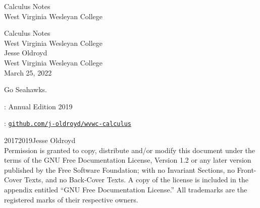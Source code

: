 \documentclass[twoside,10pt,]{book}
\newcommand{\titlepagefont}{\relax}
\newcommand{\mono}[1]{\texttt{#1}}
\numberwithin{equation}{part}
\begin{document}
\raggedbottom
\frontmatter
\thispagestyle{empty}
{\titlepagefont\centering
\vspace*{0.28\textheight}
{\Huge Calculus Notes}\\[2\baselineskip]
{\LARGE West Virginia Wesleyan College}\\
}
\clearpage
\thispagestyle{empty}
\null%
\clearpage
\thispagestyle{empty}
{\titlepagefont\centering
\vspace*{0.14\textheight}
{\Huge Calculus Notes}\\[\baselineskip]
{\LARGE West Virginia Wesleyan College}\\[3\baselineskip]
{\Large Jesse Oldroyd}\\[0.5\baselineskip]
{\Large West Virginia Wesleyan College}\\[3\baselineskip]
{\Large March 25, 2022}\\}
\clearpage
\thispagestyle{empty}
\hypertarget{x:colophon:front-colophon}{}\noindent
Go Seahawks.%
\par
{}
: Annual Edition 2019\par\medskip
{}: \href{https:\slash{}\slash{}github.com\slash{}j-oldroyd\slash{}wvwc-calculus}{\mono{github.com/j-oldroyd/wvwc-calculus}}\par\medskip
\noindent\textcopyright{}2017\textendash{}2019\quad{}Jesse Oldroyd\\[0.5\baselineskip]
Permission is granted to copy, distribute and\slash{}or modify this document under the terms of the GNU Free Documentation License, Version 1.2 or any later version published by the Free Software Foundation; with no Invariant Sections, no Front-Cover Texts, and no Back-Cover Texts.  A copy of the license is included in the appendix entitled ``GNU Free Documentation License.''  All trademarks\texttrademark{} are the registered\textregistered{} marks of their respective owners.\par\medskip
{}
\null\clearpage
%
%
\typeout{************************************************}
\end{document}
